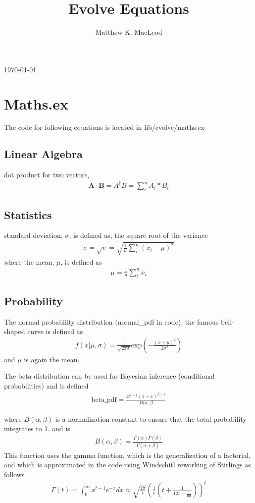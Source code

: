 \documentclass[jcp,aip,amsmath]{revtex4-1}
\begin{document}
\title{Evolve Equations}
\author{Matthew K. MacLeod}
\maketitle
\today

\section{Maths.ex}
The code for following equations is located in lib/evolve/maths.ex

\subsection{Linear Algebra}
dot product for two vectors,
\begin{align}
\mathbf{A} \cdot \mathbf{B} = A^\dag B = \sum_i^n A_i * B_i
\end{align}

\subsection{Statistics}

standard deviation, $\sigma$, is defined as, the square root of the variance
\begin{align}
\sigma = \sqrt{v} =  \sqrt{\frac{1}{n}\sum_i^n (x_i - \mu)^2}
\end{align}
where the mean, $\mu$, is defined as
\begin{align}
\mu = \frac{1}{n} \sum_i^n x_i
\end{align}

\subsection{Probability}
 The normal probability distribution (normal\_pdf in code), the famous bell-shaped curve is
defined as
\begin{align}
f(x|\mu,\sigma) = \frac{1}{\sqrt{2\pi\sigma}}\mathrm{exp}\left(-\frac{(x-\mu)^2}{2\sigma^2}\right)
\end{align}
and $\mu$ is again the mean.

The beta distribution can be used for Bayesian inference (conditional probabilities) and is defined
\begin{align}
\mathrm{beta\_pdf} = \frac{x^{\alpha-1}(1-x)^{\beta-1}}{B(\alpha,\beta}
\end{align}

where $B(\alpha,\beta)$ is a normalization constant to ensure that the total probability integrates to 1.
and is
\begin{align}
B(\alpha,\beta) = \frac{\Gamma(\alpha) \Gamma(\beta) }{\Gamma(\alpha + \beta)}
\end{align}
This function uses the gamma function, which is the generalization of a factorial, and which is approximated in the code using Windschitl reworking of Stirlings as follows
\begin{align}
\Gamma(t) = \int_0^{\infty} x^{t-1} e^{-x} dx \approx  \sqrt{\frac{2\pi}{t}}\left(\frac{1}{e}\left(t + \frac{1}{12t -\frac{1}{10t}}\right)\right)^t
\end{align}
\end{document}
